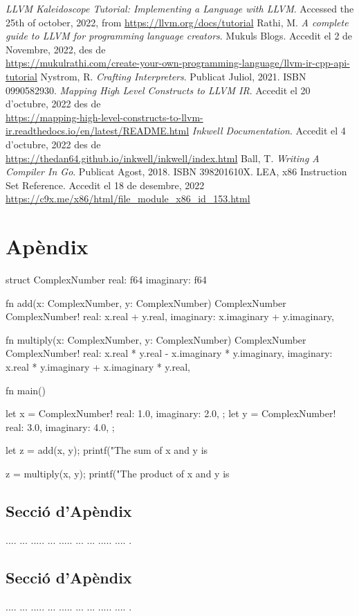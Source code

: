 ﻿\documentclass[10pt,a4paper,twocolumn,twoside]{article}
\begin{document}
\begin{thebibliography}{11}

 \textit{LLVM Kaleidoscope Tutorial: Implementing a Language with LLVM}. Accessed the 25th of october, 2022, from \url{https://llvm.org/docs/tutorial}
 Rathi, M. \textit{A complete guide to LLVM for programming language creators}. Mukuls Blogs. Accedit el 2 de Novembre, 2022, des de \\\url{https://mukulrathi.com/create-your-own-programming-language/llvm-ir-cpp-api-tutorial}
 Nystrom, R. \textit{Crafting Interpreters}. Publicat Juliol, 2021. ISBN 0990582930.
 \textit{Mapping High Level Constructs to LLVM IR}. Accedit el 20 d'octubre, 2022 des de \\\url{https://mapping-high-level-constructs-to-llvm-ir.readthedocs.io/en/latest/README.html}
 \textit{Inkwell Documentation}. Accedit el 4 d'octubre, 2022 des de \\\url{https://thedan64.github.io/inkwell/inkwell/index.html}
 Ball, T. \textit{Writing A Compiler In Go}. Publicat Agost, 2018. ISBN 398201610X.
 LEA, x86 Instruction Set Reference. Accedit el 18 de desembre, 2022 \\\url{https://c9x.me/x86/html/file_module_x86_id_153.html}

\end{thebibliography}

\appendix

\section*{Apèndix}

\begin{code}
struct ComplexNumber {
    real:      f64
    imaginary: f64
}

fn add(x: ComplexNumber, y: ComplexNumber) ComplexNumber {
    ComplexNumber!{
        real: x.real + y.real,
        imaginary: x.imaginary + y.imaginary,
    }
}

fn multiply(x: ComplexNumber, y: ComplexNumber) ComplexNumber {
    ComplexNumber!{
        real: x.real * y.real - x.imaginary * y.imaginary,
        imaginary: x.real * y.imaginary + x.imaginary * y.real,
    }
}

fn main() {
    let x = ComplexNumber!{
        real: 1.0,
        imaginary: 2.0,
    };
    let y = ComplexNumber!{
        real: 3.0,
        imaginary: 4.0,
    };

    let z = add(x, y);
    printf("The sum of x and y is %

    z = multiply(x, y);
    printf("The product of x and y is %
}
\end{code}

\setcounter{section}{1}

\subsection{Secció d'Apèndix}
.... ... ..... ... ..... ... ... ..... .... .

\subsection{Secció d'Apèndix}
.... ... ..... ... ..... ... ... ..... .... .
\end{document}

